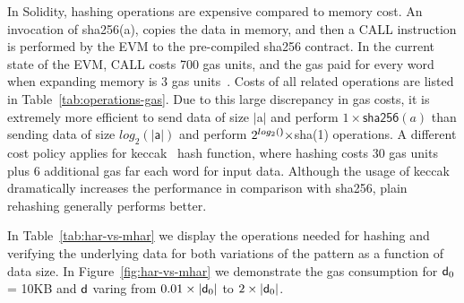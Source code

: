 In Solidity, hashing operations are expensive compared to memory cost. An
invocation of \textsf{sha256}(\textsf{a}), copies the data in memory, and then
a \textsf{CALL} instruction is performed by the EVM to the pre-compiled
\textsf{sha256} contract. In the current state of the EVM, \textsf{CALL} costs
700 gas units, and the gas paid for every word when expanding memory is 3 gas
units~\cite{wood}. Costs of all related operations are listed in
Table~\ref{tab:operations-gas}. Due to this large discrepancy in gas costs, it
is extremely more efficient to send data of size $|$\textsf{a}$|$ and perform
$1 \times \textsf{sha256}(a)$ than sending data of size $log_2(|\textsf{a}|)$
and perform $2^{log_2(\textsf)} \times$\textsf{sha}(1) operations. A different
cost policy applies for \textsf{keccak}~\cite{keccak} hash function, where
hashing costs 30 gas units plus 6 additional gas far each word for input data.
Although the usage of \textsf{keccak} dramatically increases the performance in
comparison with \textsf{sha256}, plain rehashing generally performs better.



In Table~\ref{tab:har-vs-mhar} we display the operations needed for hashing and
verifying the underlying data for both variations of the pattern as a function
of data size. In Figure~\ref{fig:har-vs-mhar} we demonstrate the gas
consumption for $\mathsf{d}_0$ = 10KB and $\mathsf{d}$ varing from $0.01
\times|\mathsf{d}_0|$ to $2\times|\mathsf{d}_0|$.



